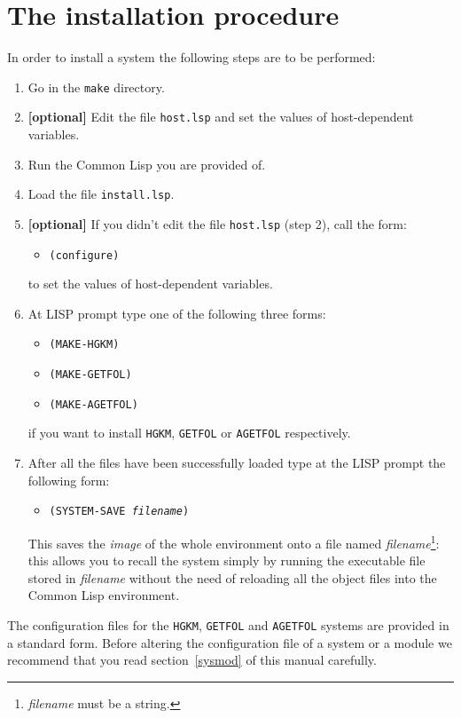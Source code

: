 \section{The installation procedure}
\label{instproc}
In order to install a system the following steps are to be performed:
\begin{enumerate}
	\item
		Go in the {\tt make} directory.
	\item {\bf [optional]}
		Edit the file {\tt host.lsp} and set the values of host-dependent
		variables.
	\item
		Run the Common Lisp you are provided of.
	\item
		Load the file {\tt install.lsp}.
	\item {\bf [optional]}
		If you didn't edit the file {\tt host.lsp} (step 2), call the form:
		\begin{itemize}
			\item
				{\tt (configure)}
		\end{itemize}
		to set the values of host-dependent variables.
	\item 
		At LISP prompt type one of the following three forms:
      \begin{itemize}
	      \item {\tt (MAKE-HGKM)}
	      \item {\tt (MAKE-GETFOL)}
			\item {\tt (MAKE-AGETFOL)}
      \end{itemize}
		if you want to install {\tt HGKM}, {\tt GETFOL} or {\tt AGETFOL}
		respectively. 
	\item
		After all the files have been successfully loaded type at the LISP
		prompt the following form:
      \begin{itemize}
	      \item {\tt (SYSTEM-SAVE {\it filename})}
      \end{itemize}
		This saves the {\it image} of the whole environment onto a file named
		{\it filename}\footnote{
			{\it filename} must be a string.
		}: this allows you to recall the system simply by running the executable
		file stored in {\it filename} without the need of reloading all the
		object files into the Common Lisp environment.
\end{enumerate}

The configuration files for the {\tt HGKM}, {\tt GETFOL} and {\tt AGETFOL}
systems are provided in a standard form.
Before altering the configuration file of a system or a module
we recommend that you read section~\ref{sysmod} of this manual carefully.
